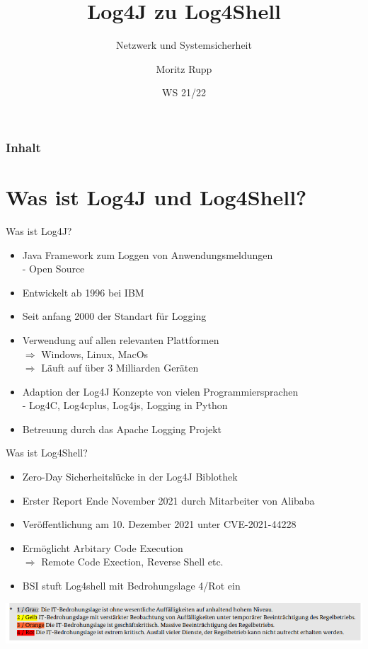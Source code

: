 \documentclass{beamer}
\title[Netzwerk und Systemsicherheit]{Log4J zu Log4Shell}
\subtitle{Netzwerk und Systemsicherheit}
\author{Moritz Rupp}
\institute[MR]{Hochschule Albstadt-Sigmaringen}
\date{WS 21/22}
\begin{document}
\begin{frame}
\titlepage
\end{frame}
\begin{frame}
\frametitle{Inhalt}
\tableofcontents    
\end{frame}
\section{Was ist Log4J und Log4Shell?}
\begin{frame}{Was ist Log4J?}
\begin{itemize}
 \item Java Framework zum Loggen von Anwendungsmeldungen\\
 - Open Source
 \item Entwickelt ab 1996 bei IBM
 \item Seit anfang 2000 der Standart für Logging\\
 \item Verwendung auf allen relevanten Plattformen\\
 $\Rightarrow$ Windows, Linux, MacOs\\
 $\Rightarrow$ Läuft auf über 3 Milliarden Geräten
 \item Adaption der Log4J Konzepte von vielen Programmiersprachen\\
 - Log4C, Log4cplus, Log4js, Logging in Python 
 \item Betreuung durch das Apache Logging Projekt
\end{itemize}
\end{frame}
\begin{frame}{Was ist Log4Shell?}
\begin{itemize}
\item Zero-Day Sicherheitslücke in der Log4J Biblothek
\item Erster Report Ende November 2021 durch Mitarbeiter von Alibaba 
\item Veröffentlichung am 10. Dezember 2021 unter CVE-2021-44228
\item Ermöglicht Arbitary Code Execution\\
$\Rightarrow$ Remote Code Exection, Reverse Shell etc.
\item BSI stuft Log4shell mit Bedrohungslage 4/Rot ein

\end{itemize}
\begin{center}
 \includegraphics[scale=0.35]{bsilog4j.png}
\end{center}


 
\end{frame}
\end{document}
